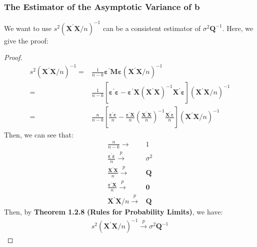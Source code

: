 \documentclass{article}
\begin{document}
\subsubsection{The Estimator of the Asymptotic Variance of b}
We want to use $s^2 (\boldsymbol{X}^\prime \boldsymbol{X} / n)^{-1}$ can be a consistent estimator of $\sigma^2 \boldsymbol{Q}^{-1}$. Here, we give the proof:
	\begin{proof}
		\mbox{}\\
			\begin{align*}
				s^2 (\boldsymbol{X}^\prime \boldsymbol{X} / n)^{-1} = &\frac{1}{n - k}\boldsymbol{\varepsilon}^\prime \boldsymbol{M} \boldsymbol{\varepsilon} (\boldsymbol{X}^\prime \boldsymbol{X} / n)^{-1}\\
				= &\frac{1}{n - k} [\boldsymbol{\varepsilon}^\prime \boldsymbol{\varepsilon} - \boldsymbol{\varepsilon}^\prime \boldsymbol{X} (\boldsymbol{X}^\prime \boldsymbol{X})^{-1} \boldsymbol{X}^\prime \boldsymbol{\varepsilon}] (\boldsymbol{X}^\prime \boldsymbol{X} / n)^{-1}\\
				= &\frac{n}{n-k} \left[ \frac{\boldsymbol{\varepsilon}^\prime \boldsymbol{\varepsilon}}{n} - \frac{\boldsymbol{\varepsilon}^\prime \boldsymbol{X}}{n} \left( \frac{\boldsymbol{X}^\prime \boldsymbol{X}}{n} \right)^{-1} \frac{\boldsymbol{X}^\prime \boldsymbol{\varepsilon}}{n} \right] (\boldsymbol{X}^\prime \boldsymbol{X} / n)^{-1}
			\end{align*}
		Then, we can see that:
			\begin{align*}
				\frac{n}{n - k} \to &1\\
				\frac{\boldsymbol{\varepsilon}^\prime \boldsymbol{\varepsilon}}{n} \xrightarrow{p} &\sigma^2\\
				\frac{\boldsymbol{X}^\prime \boldsymbol{X}}{n} \xrightarrow{p} &\boldsymbol{Q}\\
				\frac{\boldsymbol{\varepsilon}^\prime \boldsymbol{X}}{n} \xrightarrow{p} & \boldsymbol{0}\\
				\boldsymbol{X}^\prime \boldsymbol{X} / n \xrightarrow{p} &\boldsymbol{Q}
			\end{align*}
		Then, by \textbf{Theorem 1.2.8} \textbf{(Rules for Probability Limits)}, we have:
			\begin{align*}
				s^2 (\boldsymbol{X}^\prime \boldsymbol{X} / n)^{-1}  \xrightarrow{p} \sigma^2 \boldsymbol{Q}^{-1} 
			\end{align*}
	\end{proof}
\end{document}
